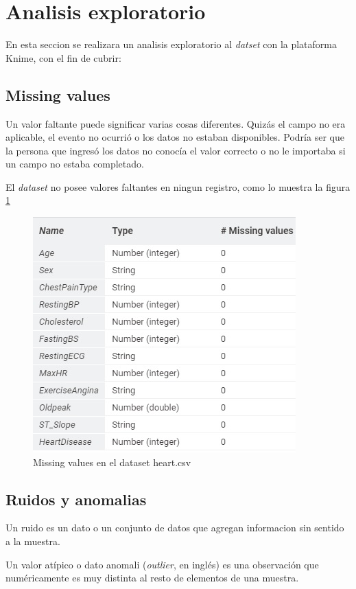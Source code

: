 \documentclass[12pt, letterpaper]{article}
\begin{document}
\section{Analisis exploratorio}
En esta seccion se realizara un analisis exploratorio al \textit{datset} 
con la plataforma Knime, con el fin de cubrir:

\subsection{Missing values}
Un valor faltante puede significar varias cosas diferentes. 
Quizás el campo no era aplicable, el evento no ocurrió o los datos no estaban disponibles. 
Podría ser que la persona que ingresó los datos no conocía el valor correcto o no le importaba 
si un campo no estaba completado. \cite{missin_values}

El \textit{dataset} no posee valores faltantes en ningun registro, como lo muestra la figura
\ref{fig:missing_values}
\begin{figure}[h]
    \centering
    \includegraphics[scale=1]{missing_values.jpg}
    \caption{Missing values en el dataset heart.csv}
    \label{fig:missing_values}
\end{figure}

\subsection{Ruidos y anomalias}

Un ruido es un dato o un conjunto de datos que agregan informacion sin sentido a la muestra.
\cite{ruido}

Un valor atípico o dato anomali (\textit{outlier}, en inglés) 
es una observación que numéricamente es muy distinta al resto de elementos de una muestra.
\cite{anomalia}
\end{document}

